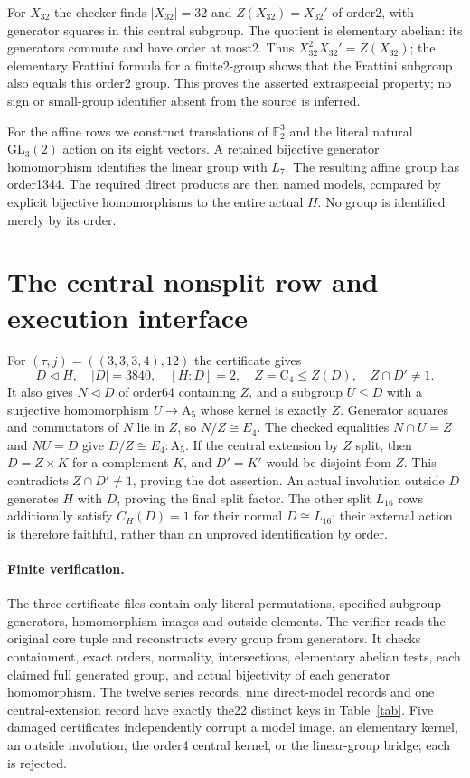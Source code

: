 \documentclass[11pt]{article}
\newcommand{\C}{\mathrm C}\newcommand{\A}{\mathrm A}\newcommand{\Sym}{\mathrm S}\newcommand{\PSL}{\mathrm{PSL}}
\begin{document}
For $X_{32}$ the checker finds $|X_{32}|=32$ and
$Z(X_{32})=X_{32}'$ of order2, with generator squares in this central
subgroup. The quotient is elementary abelian: its generators commute and
have order at most2. Thus $X_{32}^2X_{32}'=Z(X_{32})$; the elementary
Frattini formula for a finite2-group shows that the Frattini subgroup also
equals this order2 group. This proves the asserted extraspecial property;
no sign or small-group identifier absent from the source is inferred.

For the affine rows we construct translations of $\mathbb F_2^3$ and the
literal natural $\mathrm{GL}_3(2)$ action on its eight vectors. A retained
bijective generator homomorphism identifies the linear group with $L_7$.
The resulting affine group has order1344. The required direct products
are then named models, compared by explicit bijective homomorphisms to
the entire actual $H$. No group is identified merely by its order.
\newpage
\section{The central nonsplit row and execution interface}
For $(\tau,j)=((3,3,3,4),12)$ the certificate gives
\[
 D\triangleleft H,\quad |D|=3840,\quad [H:D]=2,\quad
 Z=\C_4\leq Z(D),\quad Z\cap D'\ne1.
\]
It also gives $N\triangleleft D$ of order64 containing $Z$, and a subgroup
$U\leq D$ with a surjective homomorphism $U\to\A_5$ whose kernel is exactly
$Z$. Generator squares and commutators of $N$ lie in $Z$, so
$N/Z\cong E_4$. The checked equalities $N\cap U=Z$ and $NU=D$ give
$D/Z\cong E_4:\A_5$. If the central extension by $Z$ split, then
$D=Z\times K$ for a complement $K$, and $D'=K'$ would be disjoint from
$Z$. This contradicts $Z\cap D'\ne1$, proving the dot assertion.
An actual involution outside $D$ generates $H$ with $D$, proving the final
split factor. The other split $L_{16}$ rows additionally satisfy
$C_H(D)=1$ for their normal $D\cong L_{16}$; their external action is
therefore faithful, rather than an unproved identification by order.

\paragraph{Finite verification.}
The three certificate files contain only literal permutations, specified
subgroup generators, homomorphism images and outside elements. The verifier
reads the original core tuple and reconstructs every group from generators.
It checks containment, exact orders, normality, intersections, elementary
abelian tests, each claimed full generated group, and actual bijectivity
of each generator homomorphism. The twelve series records, nine direct-model
records and one central-extension record have exactly the22 distinct keys
in Table~\ref{tab}. Five damaged certificates independently corrupt a model
image, an elementary kernel, an outside involution, the order4 central
kernel, or the linear-group bridge; each is rejected.
\end{document}
